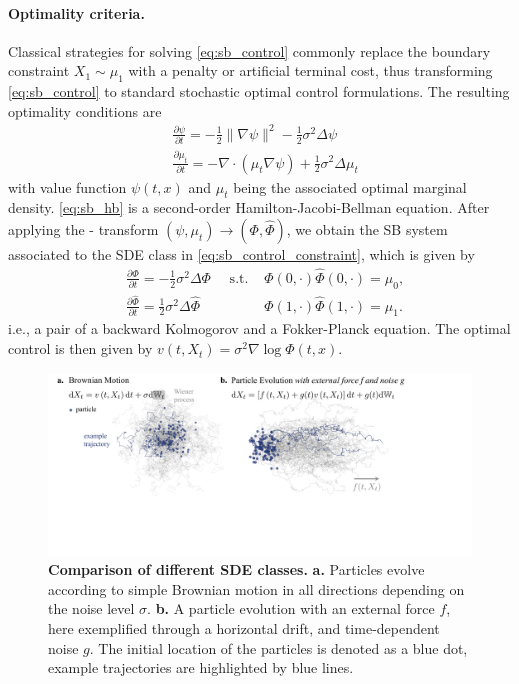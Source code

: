 \paragraph{Optimality criteria.}
Classical strategies for solving \eqref{eq:sb_control} commonly replace the boundary constraint $X_1 \sim \mu_1$ with a penalty or artificial terminal cost, thus transforming \eqref{eq:sb_control} to standard stochastic optimal control formulations. 
The resulting optimality conditions are
\begin{align}
\label{eq:sb_hb} & \frac{\partial \psi}{\partial t} = -\frac{1}{2}\|\nabla \psi\|^2 -\frac{1}{2}\sigma^2 \Delta \psi \\
\label{eq:sb_optimality}
& \frac{\partial \mu_t}{\partial t} = - \nabla \cdot(\mu_t \nabla \psi) +\frac{1}{2}\sigma^2 \Delta \mu_t
\end{align}
with value function $\psi(t, x)$ and $\mu_t$ being the associated optimal marginal density. \cref{eq:sb_hb} is a second-order Hamilton-Jacobi-Bellman equation.
After applying the \citeauthor{hopf1950partial}-\citeauthor{cole1951quasi} transform $(\psi, \mu_t) \rightarrow (\Phi, \widehat{\Phi})$, we obtain the \acrshort{SB} system associated to the SDE class in \eqref{eq:sb_control_constraint}, which is given by
\begin{align}
& \frac{\partial \Phi}{\partial t}=-\frac{1}{2}\sigma^2 \Delta \Phi 
\quad \text { s.t. } & \Phi(0, \cdot) \widehat{\Phi}(0, \cdot)=\mu_0, \\ \nonumber
& \frac{\partial \widehat{\Phi}}{\partial t}=\frac{1}{2}\sigma^2 \Delta \widehat{\Phi} \quad & \Phi(1, \cdot) \widehat{\Phi}(1, \cdot)=\mu_1.
\end{align}
i.e., a pair of a backward Kolmogorov and a Fokker-Planck equation. The optimal control is then given by $
v(t, X_t)=\sigma^2 \nabla \log \Phi(t, x)$.

\begin{figure}[t]
  \includegraphics[width=\textwidth]{figures/fig_comparison_sdes.pdf}
  \caption{\textbf{Comparison of different SDE classes.} \textbf{a.} Particles evolve according to simple Brownian motion in all directions depending on the noise level $\sigma$. \textbf{b.} A particle evolution with an external force $f$, here exemplified through a horizontal drift, and time-dependent noise $g$. The initial location of the particles is denoted as a blue dot, example trajectories are highlighted by blue lines.}	
  \label{fig:sde_comparison}
\end{figure}

